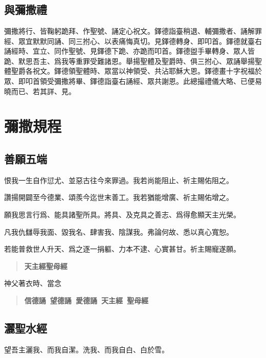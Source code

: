 
\clearpage
\markboth{}{}
\chapter[彌撒規程]{}
\section*{與彌撒禮}
{\small 彌撒將行、皆鞠躬跪拜、作聖號、誦定心祝文。鐸德詣臺稍退、輔彌撒者、誦解罪經、眾宜默默同誦、同三拊心、以表痛悔真切。見鐸德轉身、即叩首。鐸德就臺右誦經時、宜立、同作聖號、見鐸德下跪、亦跪而叩首。鐸德盥手畢轉身、眾人皆跪、默思吾主、爲我等重罪受難諸恩。舉揚聖體及聖爵時、俱三拊心、眾誦舉揚聖體聖爵各祝文。鐸德領聖體時、眾當以神領受、共沾耶穌大恩。鐸德畫十字祝福於眾、即叩首領受彌撒將畢、鐸德詣臺右誦經、眾共謝恩。此總撮禮儀大略、已便易曉而已、若其詳、見。}

\begingroup
\let\clearpage\relax
\chapter*{彌撒規程}
\endgroup

\section*{善願五端}
\noindent 恨我一生自作愆尤、並惡古往今來罪過。我若尚能阻止、祈主賜佑阻之。

\noindent 讚揚開闢至今德業、頌羨今迄世末善工。我若猶能增廣、祈主賜佑增之。

\noindent 願我思言行爲、能具諸聖所具。將具、及克具之善志、爲得愈顯天主光榮。

\noindent 凡我仇讎辱我面、毀我名、肆害我、陰謀我。弗論何故、悉以真心寬恕。

\noindent 若能普救世人升天、爲之逐一捐軀、力本不逮、心實甚甘。祈主賜寵遂願。

\begin{quote}
\bfseries 天主經\quad 聖母經
\end{quote}

{\small 神父著衣時、當念}
\begin{quote}
    \bfseries 信德誦\ 望德誦\ 愛德誦\ 天主經\ 聖母經
\end{quote}

\section*{灑聖水經}
望吾主灑我、而我自潔。洗我、而我自白、白於雪。

